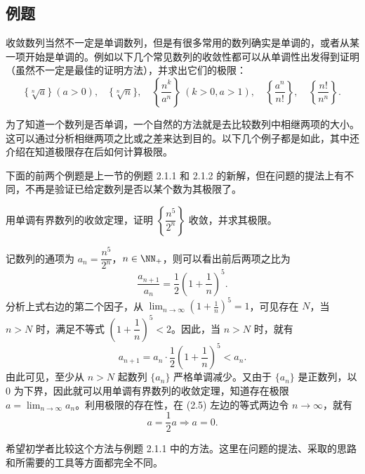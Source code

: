 \subsection{例题}

收敛数列当然不一定是单调数列，但是有很多常用的数列确实是单调的，或者从某一项开始是单调的。例如以下几个常见数列的收敛性都可以从单调性出发得到证明（虽然不一定是最佳的证明方法），并求出它们的极限：
\[
  \{\sqrt[n]{a}\}\ (a>0),\quad
  \{\sqrt[n]{n}\},\quad
  \left\{\frac{n^k}{a^n}\right\}\ (k>0,a>1),\quad
  \left\{\frac{a^n}{n!}\right\},\quad
  \left\{\frac{n!}{n^n}\right\}.
\]

为了知道一个数列是否单调，一个自然的方法就是去比较数列中相继两项的大小。这可以通过分析相继两项之比或之差来达到目的。以下几个例子都是如此，其中还介绍在知道极限存在后如何计算极限。

下面的前两个例题是上一节的例题 2.1.1 和 2.1.2 的新解，但在问题的提法上有不同，不再是验证已给定数列是否以某个数为其极限了。

\begin{xexample}[2.3.1]
用单调有界数列的收敛定理，证明 $\left\{\dfrac{n^5}{2^n}\right\}$ 收敛，并求其极限。
\end{xexample}
\begin{xproof}
记数列的通项为 $a_n=\dfrac{n^5}{2^n}$，$n\in\NN_+$，则可以看出前后两项之比为
\[
  \frac{a_{n+1}}{a_n}=\frac12\left(1+\frac1n\right)^5.
\]
分析上式右边的第二个因子，从 $\displaystyle\lim_{n\to\infty}\left(1+\frac1n\right)^5=1$，可见存在 $N$，当 $n>N$ 时，满足不等式 $\left(1+\dfrac1n\right)^5<2$。因此，当 $n>N$ 时，就有
\begin{equation}
  a_{n+1}=a_n\cdot\frac12\left(1+\frac1n\right)^5<a_n.
  \tag{2.5}
  \label{eq:2.5}
\end{equation}
由此可见，至少从 $n>N$ 起数列 $\{a_n\}$ 严格单调减少。又由于 $\{a_n\}$ 是正数列，以 0 为下界，因此就可以用单调有界数列的收敛定理，知道存在极限 $a=\displaystyle\lim_{n\to\infty}a_n$。利用极限的存在性，在 (2.5) 左边的等式两边令 $n\to\infty$，就有
\[
  a=\frac12a\Longrightarrow a=0.
\]
\end{xproof}

\begin{xremark}
希望初学者比较这个方法与例题 2.1.1 中的方法。这里在问题的提法、采取的思路和所需要的工具等方面都完全不同。
\end{xremark}

